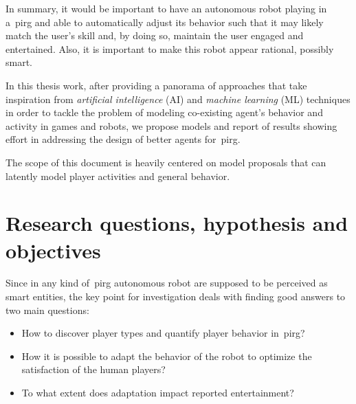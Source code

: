 
In summary, it would be important to have an autonomous robot playing in a~\gls{pirg} and able to automatically adjust its behavior such that it may likely match the user's skill and, by doing so, maintain the user engaged and entertained. Also, it is important to make this robot appear rational, possibly smart. 

In this thesis work, after providing a panorama of approaches that take inspiration from \textit{artificial intelligence} (AI) and \textit{machine learning} (ML) techniques in order to tackle the problem of modeling co-existing agent's behavior and activity in games and robots, we propose models and report of results showing effort in addressing the design of better agents for~\gls{pirg}.

The scope of this document is heavily centered on model proposals that can latently model player activities and general behavior. 

\section{Research questions, hypothesis and objectives}\label{sec:research_question}
Since in any kind of~\gls{pirg} autonomous robot are supposed to be perceived as smart entities, the key point for investigation deals with finding good answers to two main questions:

\begin{itemize}
\item How to discover player types and quantify player behavior in~\gls{pirg}?
\item How it is possible to adapt the behavior of the robot to optimize the satisfaction of the human players?
\item To what extent does adaptation impact reported entertainment?
\end{itemize}

